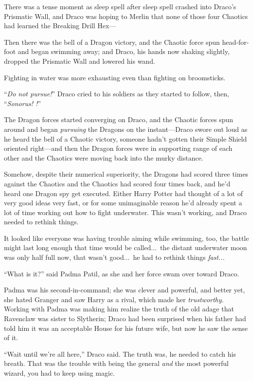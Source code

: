 There was a tense moment as sleep spell after sleep spell crashed into Draco’s Prismatic Wall, and Draco was hoping to Merlin that none of those four Chaotics had learned the Breaking Drill Hex—

Then there was the bell of a Dragon victory, and the Chaotic force spun head-for-foot and began swimming away; and Draco, his hands now shaking slightly, dropped the Prismatic Wall and lowered his wand.

Fighting in water was more exhausting even than fighting on broomsticks.

“\emph{Do not pursue!}” Draco cried to his soldiers as they started to follow, then, “\emph{Sonorus! !}”

The Dragon forces started converging on Draco, and the Chaotic forces spun around and began \emph{pursuing} the Dragons on the instant—Draco swore out loud as he heard the bell of a Chaotic victory, someone hadn’t gotten their Simple Shield oriented right—and then the Dragon forces were in supporting range of each other and the Chaotics were moving back into the murky distance.

Somehow, despite their numerical superiority, the Dragons had scored three times against the Chaotics and the Chaotics had scored four times back, and he’d heard one Dragon spy get executed. Either Harry Potter had thought of a lot of very good ideas very fast, or for some unimaginable reason he’d already spent a lot of time working out how to fight underwater. This wasn’t working, and Draco needed to rethink things.

It looked like everyone was having trouble aiming while swimming, too, the battle might last long enough that time would be called...\ the distant underwater moon was only half full now, that wasn’t good...\ he had to rethink things \emph{fast...}

“What is it?” said Padma Patil, as she and her force swam over toward Draco.

Padma was his second-in-command; she was clever and powerful, and better yet, she hated Granger and saw Harry as a rival, which made her \emph{trustworthy.} Working with Padma was making him realize the truth of the old adage that Ravenclaw was sister to Slytherin; Draco had been surprised when his father had told him it was an acceptable House for his future wife, but now he saw the sense of it.

“Wait until we’re all here,” Draco said. The truth was, he needed to catch his breath. That was the trouble with being the general \emph{and} the most powerful wizard, you had to keep using magic.

